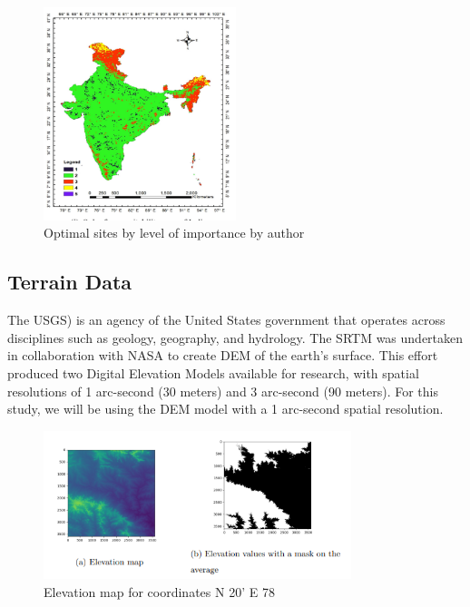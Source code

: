 \documentclass[a4paper,12pt]{Classes/RoboticsLaTeX}
\begin{document}
	\begin{figure}[H]
		\centering
		\includegraphics[width=0.5\textwidth]{Figures/Saraswat.png} %
		\caption{ Optimal sites by level of importance by author \cite{saraswat2021}}
		\label{fig:my_label} %
	\end{figure}
	

	\subsection{Terrain Data}

	The \ac{USGS}) is an agency of the United States government that operates across disciplines such as geology, geography, and hydrology. 
	The \ac{SRTM} was undertaken in collaboration with \ac{NASA} to create \ac{DEM} 
	of the earth's surface. This effort produced two Digital Elevation Models available for research, with spatial resolutions of 1 arc-second (30 meters) and 3 arc-second 
	(90 meters). For this study, we will be using the DEM model with a 1 arc-second spatial resolution\cite{farr2000}.

	\begin{figure}[H]
		\centering
		\includegraphics[width=0.8\textwidth]{Figures/Terrain.png} %
		\caption{Elevation map for coordinates N 20' E 78}
		\label{fig:my_label2} %
	\end{figure}
\end{document}
